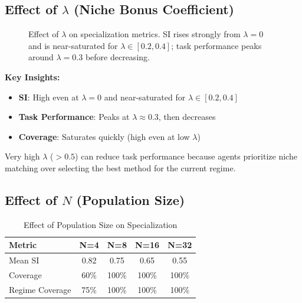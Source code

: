 \documentclass[11pt,a4paper]{article}
\theoremstyle{definition}
\theoremstyle{plain}
\begin{document}
\subsection{Effect of $\lambda$ (Niche Bonus Coefficient)}

\begin{figure}[h]
\centering
{}
\caption{Effect of $\lambda$ on specialization metrics. SI rises strongly from $\lambda=0$ and is near-saturated for $\lambda \in [0.2,0.4]$; task performance peaks around $\lambda = 0.3$ before decreasing.}
\end{figure}

\textbf{Key Insights:}
\begin{itemize}
    \item \textbf{SI}: High even at $\lambda=0$ and near-saturated for $\lambda\in[0.2,0.4]$
    \item \textbf{Task Performance}: Peaks at $\lambda \approx 0.3$, then decreases
    \item \textbf{Coverage}: Saturates quickly (high even at low $\lambda$)
\end{itemize}

\begin{warning}
Very high $\lambda$ ($> 0.5$) can reduce task performance because agents prioritize niche matching over selecting the best method for the current regime.
\end{warning}

\subsection{Effect of $N$ (Population Size)}

\begin{table}[h]
\centering
\caption{Effect of Population Size on Specialization}
\begin{tabular}{l|cccc}
\toprule
Metric & N=4 & N=8 & N=16 & N=32 \\
\midrule
Mean SI & 0.82 & 0.75 & 0.65 & 0.55 \\
Coverage & 60\% & 100\% & 100\% & 100\% \\
Regime Coverage & 75\% & 100\% & 100\% & 100\% \\
\bottomrule
\end{tabular}
\end{table}
\end{document}

